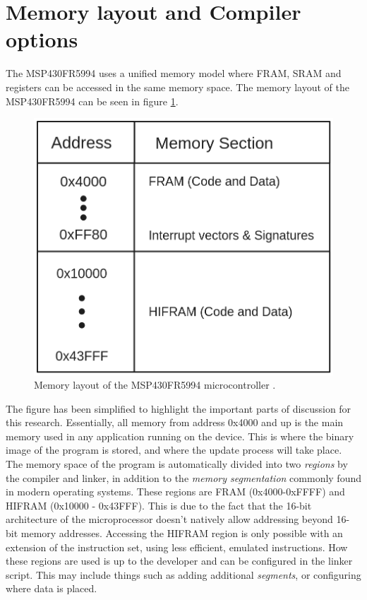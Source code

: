 \section{Memory layout and Compiler options}\label{sec:memory_layout}
The MSP430FR5994 uses a unified memory model where FRAM, SRAM and registers can be accessed in the same memory space. The memory layout of the MSP430FR5994 can be seen in figure \ref{fig:memory_layout}.
\begin{figure}[!ht]
    \begin{shaded}
    \centering
    \includegraphics[width=\figurewidth]{img/mem_layout.png}
    \caption{Memory layout of the MSP430FR5994 microcontroller \cite{fr5994DataSheet}.}
    \label{fig:memory_layout}
\end{shaded}
\end{figure}

The figure has been simplified to highlight the important parts of discussion for this research. Essentially, all memory from address 0x4000 and up is the main memory used in any application running on the device. This is where the binary image of the program is stored, and where the update process will take place. The memory space of the program is automatically divided into two \textit{regions} by the compiler and linker, in addition to the \textit{memory segmentation} commonly found in modern operating systems. These regions are FRAM (0x4000-0xFFFF) and HIFRAM (0x10000 - 0x43FFF). This is due to the fact that the 16-bit architecture of the microprocessor doesn't natively allow addressing beyond 16-bit memory addresses. Accessing the HIFRAM region is only possible with an extension of the instruction set, using less efficient, emulated instructions. How these regions are used is up to the developer and can be configured in the linker script. This may include things such as adding additional \textit{segments}, or configuring where data is placed.

